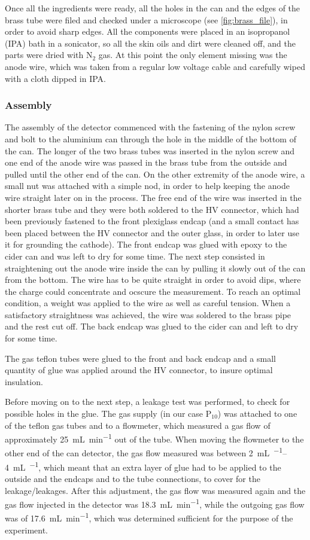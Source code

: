 Once all the ingredients were ready, all the holes in the can and the edges of
the brass tube were filed and checked under a microscope (see \ref{fig:brass_file}), in order to avoid
sharp edges. All the components were placed in an isopropanol (IPA) bath in a
sonicator, so all the skin oils and dirt were cleaned off, and the parts were
dried with $\mathrm{N}_2$ gas. At this point the only element missing was the
anode wire, which was taken from a regular low voltage cable and carefully wiped
with a cloth dipped in IPA.


\subsubsection{Assembly}

The assembly of the detector commenced with the fastening of the nylon screw and
bolt to the aluminium can through the hole in the middle of the bottom of the
can. The longer of the two brass tubes was inserted in the nylon screw and one
end of the anode wire was passed in the brass tube from the outside and pulled
until the other end of the can. On the other extremity of the anode wire, a
small nut was attached with a simple nod, in order to help keeping the anode
wire straight later on in the process. The free end of the wire was inserted in
the shorter brass tube and they were both soldered to the HV connector, which
had been previously fastened to the front plexiglass endcap (and a small contact
has been placed between the HV connector and the outer glass, in order to later
use it for grounding the cathode). The front endcap was glued with epoxy to the
cider can and was left to dry for some time. The next step consisted in
straightening out the anode wire inside the can by pulling it slowly out of the
can from the bottom. The wire has to be quite straight in order to avoid dips,
where the charge could concentrate and ocscure the measurement. To reach an
optimal condition, a weight was applied to the wire as well as careful tension.
When a satisfactory straightness was achieved, the wire was soldered to the
brass pipe and the rest cut off. The back endcap was glued to the cider can and
left to dry for some time.

The gas teflon tubes were glued to the front and back endcap and a small
quantity of glue was applied around the HV connector, to insure optimal
insulation.

Before moving on to the next step, a leakage test was performed, to check for
possible holes in the glue. The gas supply (in our case $\mathrm{P}_{10}$) was
attached to one of the teflon gas tubes and to a flowmeter, which measured a gas
flow of approximately \SI{25}{\milli\liter\per\minute} out of the tube. When
moving the flowmeter to the other end of the can detector, the gas flow measured
was between \SIrange{2}{4}{\milli\liter\per\min}, which meant that an extra layer
of glue had to be applied to the outside and the endcaps and to the tube
connections, to cover for the leakage/leakages. After this adjustment, the gas
flow was measured again and the gas flow injected in the detector was
\SI{18.3}{\milli\liter\per\minute}, while the outgoing gas flow was of
\SI{17.6}{\milli\liter\per\minute}, which was determined sufficient for the
purpose of the experiment.

